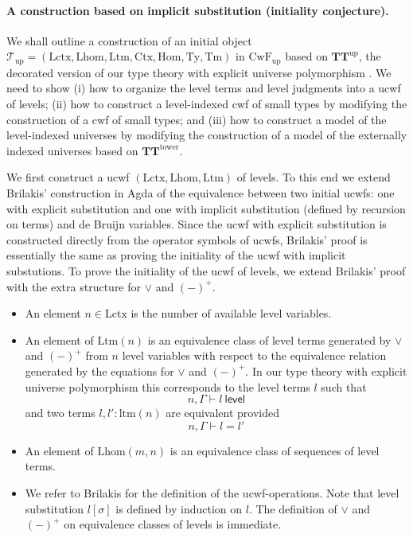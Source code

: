 \documentclass[submission,copyright,creativecommons]{eptcs}
\newcommand{\level}{\mathsf{level}}
\newcommand{\Ctx}{\mathrm{Ctx}}
\newcommand{\Sub}{\mathrm{Hom}}
\newcommand{\Ty}{\mathrm{Ty}}
\newcommand{\Tm}{\mathrm{Tm}}
\newcommand{\Lctx}{\mathrm{Lctx}}
\newcommand{\Lsub}{\mathrm{Lhom}}
\newcommand{\Ltm}{\mathrm{Ltm}}
\def\lhom{\mathrm{lhom}}
\newcommand{\T}{\mathsf{T}}
\def\ltm{\mathrm{ltm}}
\def\lp{\mathrm{lp}}
\def\lq{\mathrm{lq}}
\def\s{\mathrm{s}}
\def\T{\mathcal{T}}
\def\CwFint{\mathrm{CwF_{up}}}
\def\TText{{\mathbf{TT}^\mathrm{tower}}}
\def\TTint{{\mathbf{TT}^\mathrm{up}}}
\def\Tint{\T_\mathrm{up}}
\begin{document}
\paragraph{A construction based on implicit substitution (initiality conjecture).} We shall outline a construction of an initial object $\Tint = (\Lctx,\Lsub,\Ltm,\Ctx,\Sub,\Ty,\Tm)$ in $\CwFint$ based on $\TTint$, the decorated version of our type theory with explicit universe polymorphism \cite[Section 4]{BezemCDE22}.
We need to show (i) how to organize the level terms and level judgments into a ucwf of levels; (ii) how to construct a level-indexed cwf of small types by modifying the construction of a cwf of small types; and (iii) how to construct a model of the level-indexed universes by modifying the construction of a model of the externally indexed universes based on $\TText$.

We first construct a ucwf $(\Lctx,\Lsub,\Ltm)$ of levels. To this end we extend Brilakis'  \cite{Brilakis18} construction in Agda of the equivalence between two initial ucwfs: one with explicit substitution and one with implicit substitution (defined by recursion on terms) and de Bruijn variables. Since the ucwf with explicit substitution is constructed directly from the operator symbols of ucwfs, Brilakis' proof is essentially the same as proving the initiality of the ucwf with implicit substutions. To prove the initiality of the ucwf of levels, we extend Brilakis' proof with the extra structure for $\vee$ and $(-)^+$.
\begin{itemize}
\item An element $n \in \Lctx$ is the number of available level variables.
\item An element of $\Ltm(n)$ is an equivalence class of level terms generated by $\vee$ and $(-)^+$ from $n$ level variables with respect to the equivalence relation generated by the equations for $\vee$ and $(-)^+$. In our type theory with explicit universe polymorphism \cite{BezemCDE22} this corresponds to the level terms $l$ such that
$$
n, \Gamma \vdash l\ \level
$$
and two terms $l, l' : \ltm(n)$ are equivalent provided
$$
n, \Gamma \vdash l = l'
$$
\item An element of $\Lsub(m,n)$ is an equivalence class of sequences of level terms.
\item We refer to Brilakis for the definition of the ucwf-operations. Note that level substitution $l[\sigma]$ is defined by induction on $l$. The definition of $\vee$ and $(-)^+$ on equivalence classes of levels is immediate.
\end{itemize}
\end{document}

